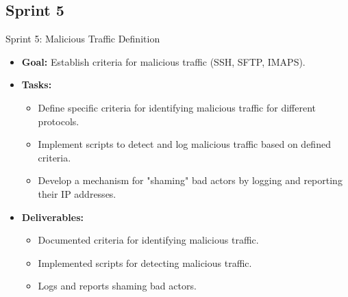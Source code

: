 \documentclass[11pt,a4paper]{article}
\begin{document}
    \subsection{Sprint 5}\label{subsec:sprint-5}
    \begin{frame}{Sprint 5: Malicious Traffic Definition}
        \begin{itemize}
            \item \textbf{Goal:} Establish criteria for malicious traffic (SSH, SFTP, IMAPS).
            \item \textbf{Tasks:}
            \begin{itemize}
                \item Define specific criteria for identifying malicious traffic for different protocols.
                \item Implement scripts to detect and log malicious traffic based on defined criteria.
                \item Develop a mechanism for "shaming" bad actors by logging and reporting their IP addresses.
            \end{itemize}
            \item \textbf{Deliverables:}
            \begin{itemize}
                \item Documented criteria for identifying malicious traffic.
                \item Implemented scripts for detecting malicious traffic.
                \item Logs and reports shaming bad actors.
            \end{itemize}
        \end{itemize}
    \end{frame}
\end{document}
